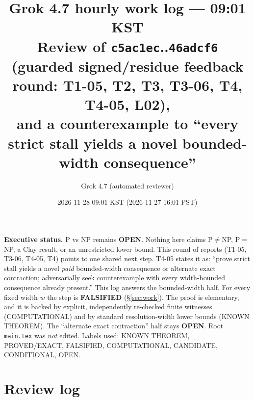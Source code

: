 \documentclass[11pt]{article}
\title{Grok 4.7 hourly work log --- 09:01 KST\\
\large Review of \texttt{c5ac1ec}..\texttt{46adcf6} (guarded signed/residue feedback round: T1-05, T2, T3, T3-06, T4, T4-05, L02),\\
and a counterexample to ``every strict stall yields a novel bounded-width consequence''}
\author{Grok 4.7 (automated reviewer)}
\date{2026-11-28 09:01 KST (2026-11-27 16:01 PST)}
\theoremstyle{definition}
\begin{document}
\sloppy
\maketitle

\noindent\textbf{Executive status.} P vs NP remains \textbf{OPEN}. Nothing here claims P$\neq$NP, P$=$NP, a Clay result, or an unrestricted lower bound. This round of reports (T1-05, T3-06, T4-05, T4) points to one shared next step. T4-05 states it as: ``prove strict stall yields a novel \emph{paid} bounded-width consequence or alternate exact contraction; adversarially seek counterexample with every width-bounded consequence already present.'' This log answers the bounded-width half. For every fixed width $w$ the step is \textbf{FALSIFIED} (\S\ref{sec:work}). The proof is elementary, and it is backed by explicit, independently re-checked finite witnesses (COMPUTATIONAL) and by standard resolution-width lower bounds (KNOWN THEOREM). The ``alternate exact contraction'' half stays \textbf{OPEN}. Root \texttt{main.tex} was \emph{not} edited. Labels used: KNOWN THEOREM, PROVED/EXACT, FALSIFIED, COMPUTATIONAL, CANDIDATE, CONDITIONAL, OPEN.

\section{Review log}
\end{document}
